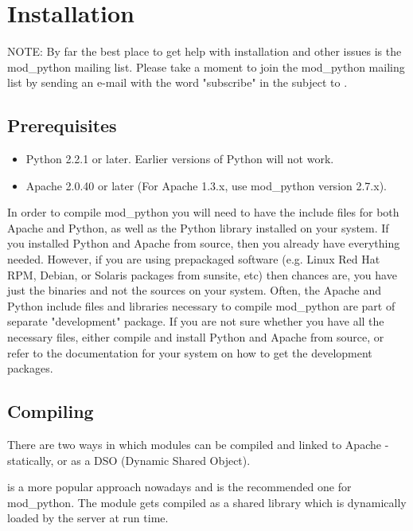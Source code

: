 \chapter{Installation\label{installation}}
NOTE: By far the best place to get help with installation and other
issues is the mod_python mailing list. Please take a moment to join
the mod_python mailing list by sending an e-mail with the word
"subscribe" in the subject to .

\section{Prerequisites\label{inst-prerequisites}}

\begin{itemize}
\item
Python 2.2.1 or later. Earlier versions of Python will not work.
\item
Apache 2.0.40 or later (For Apache 1.3.x, use mod_python version 2.7.x).
\end{itemize}

In order to compile mod_python you will need to have the include files
for both Apache and Python, as well as the Python library installed on
your system.  If you installed Python and Apache from source, then you
already have everything needed. However, if you are using prepackaged
software (e.g. Linux Red Hat RPM, Debian, or Solaris packages from
sunsite, etc) then chances are, you have just the binaries and not the
sources on your system. Often, the Apache and Python include files and
libraries necessary to compile mod_python are part of separate
"development" package. If you are not sure whether you have all the
necessary files, either compile and install Python and Apache from
source, or refer to the documentation for your system on how to get
the development packages.

\section{Compiling\label{inst-compiling}}

There are two ways in which modules can be compiled and linked to
Apache - statically, or as a DSO (Dynamic Shared Object).

 is a more popular approach nowadays and is the recommended
one for mod_python. The module gets compiled as a shared library which
is dynamically loaded by the server at run time.

